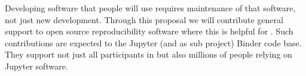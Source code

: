 \begin{task}[
  title=Maintenance of open source reproducibility software,
  id=maintenance,
  lead=SRL,
  PM=6,
  partners={QS}
]

Developing software that people will use requires maintenance of that
software, not just new development. Through  this proposal we will
contribute general support to open source reproducibility software
where this is helpful for \TheProject. Such contributions are expected 
to the Jupyter (and as sub project) Binder code base. They support not
just all participants in \TheProject but also millions of people
relying on Jupyter software.


% 
% 
% 
% 

\end{task}
